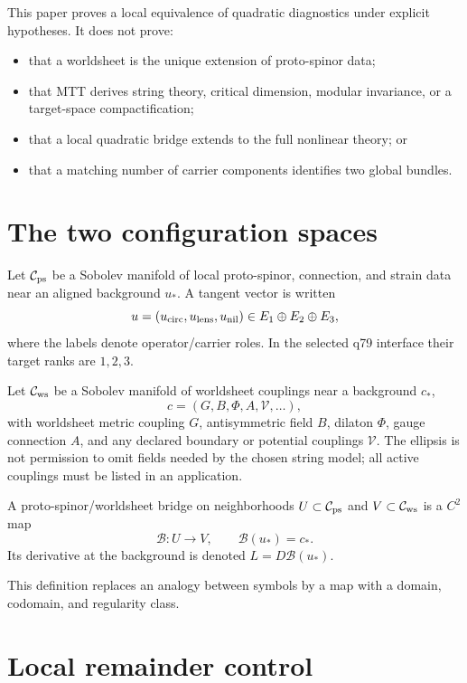 \documentclass[11pt]{article}
\begin{document}
This paper proves a local equivalence of quadratic diagnostics under explicit
hypotheses.  It does not prove:
\begin{itemize}
\item that a worldsheet is the unique extension of proto-spinor data;
\item that MTT derives string theory, critical dimension, modular invariance,
or a target-space compactification;
\item that a local quadratic bridge extends to the full nonlinear theory; or
\item that a matching number of carrier components identifies two global
bundles.
\end{itemize}

\section{The two configuration spaces}

Let $\mathcal C_{\rm ps}$ be a Sobolev manifold of local proto-spinor,
connection, and strain data near an aligned background $u_\ast$.  A tangent
vector is written
\[
 u=(u_{\rm circ},u_{\rm lens},u_{\rm nil})
 \in E_1\oplus E_2\oplus E_3,
\]
where the labels denote operator/carrier roles.  In the selected q79 interface
their target ranks are $1,2,3$.

Let $\mathcal C_{\rm ws}$ be a Sobolev manifold of worldsheet couplings near a
background $c_\ast$,
\[
 c=(G,B,\Phi,A,\mathcal V,\ldots),
\]
with worldsheet metric coupling $G$, antisymmetric field $B$, dilaton $\Phi$,
gauge connection $A$, and any declared boundary or potential couplings
$\mathcal V$.  The ellipsis is not permission to omit fields needed by the
chosen string model; all active couplings must be listed in an application.

\begin{definition}
A proto-spinor/worldsheet bridge on neighborhoods
$U\subset\mathcal C_{\rm ps}$ and $V\subset\mathcal C_{\rm ws}$ is a $C^2$ map
\[
 \mathcal B:U\longrightarrow V,
 \qquad \mathcal B(u_\ast)=c_\ast.
\]
Its derivative at the background is denoted
$L=D\mathcal B(u_\ast)$.
\end{definition}

This definition replaces an analogy between symbols by a map with a domain,
codomain, and regularity class.

\section{Local remainder control}
\end{document}
